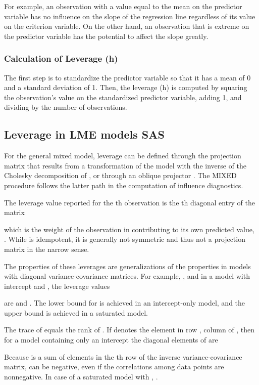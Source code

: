 \documentclass[12pt, a4paper]{article}
\begin{document}
For example, an observation with a value equal to the mean on the predictor variable has no influence on the slope of the regression line regardless of its value on the criterion variable. On the other hand, an observation that is extreme on the predictor variable has the potential to affect the slope greatly.
			
\subsubsection{Calculation of Leverage (h)}
The first step is to standardize the predictor variable so that it has a mean of 0 and a standard deviation of 1. Then, the leverage (h) is computed by squaring the observation's value on the standardized predictor variable, adding 1, and dividing by the number of observations.
			

\subsection{Leverage in LME models SAS}

For the general mixed model, leverage can be defined through the projection matrix that results from a transformation of the model with the inverse of the Cholesky decomposition of , or through an oblique projector \citep{schabenberger}. The MIXED procedure follows the latter path in the computation of influence diagnostics. 


The leverage value reported for the th observation is the th diagonal entry of the matrix

which is the weight of the observation in contributing to its own predicted value, .
While  is idempotent, it is generally not symmetric and thus not a projection matrix in the narrow sense.

The properties of these leverages are generalizations of the properties in models with diagonal variance-covariance matrices. For example, , and in a model with intercept and , the leverage values

are  and . The lower bound for  is achieved in an intercept-only model, and the upper bound is achieved in a saturated model. 

The trace of  equals the rank of .
If  denotes the element in row , column  of , then for a model containing only an intercept the diagonal elements of  are

Because  is a sum of elements in the th row of the inverse variance-covariance matrix,  can be negative, even if the correlations among data points are nonnegative. In case of a saturated model with , .			
			
\end{document}
